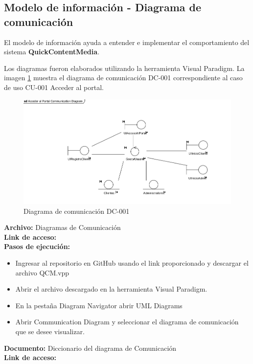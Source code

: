 \newpage
\subsection{Modelo de información - Diagrama de comunicación}
El modelo de información ayuda a entender e implementar el comportamiento del sistema \textbf{QuickContentMedia}.

Los diagramas fueron elaborados utilizando la herramienta {Visual Paradigm}. La imagen \ref{DiagComu} muestra el diagrama de comunicación DC-001 correspondiente al caso de uso CU-001 Acceder al portal.


\begin{figure}[H]
    \centering
    \includegraphics[width=0.95\linewidth]{Media/3_Analisis/3_ModeloDeRequisitos/DC-001.png}
    \caption{Diagrama de comunicación DC-001}
    \label{DiagComu}
\end{figure}

\textbf{Archivo:} {Diagramas de Comunicación} \\
\textbf{Link de acceso:} \linkDiagramaComunicacion \\

\textbf{Pasos de ejecución:}
\begin{itemize}
    \item Ingresar al repositorio en GitHub usando el link proporcionado y descargar el archivo QCM.vpp
    \item Abrir el archivo descargado en la herramienta Visual Paradigm.
    \item En la pestaña Diagram Navigator abrir UML Diagrams
    \item Abrir Communication Diagram y seleccionar el diagrama de comunicación que se desee visualizar.
\end{itemize}

\textbf{Documento:} {Diccionario del diagrama de Comunicación} \\
\textbf{Link de acceso:} \linkDiccionarioComunicacion \\

